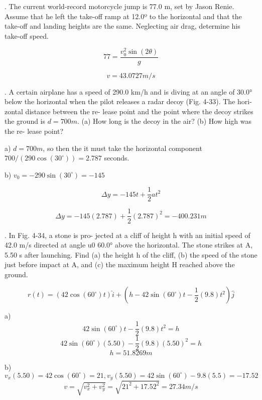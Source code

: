 \documentclass{scrreprt} %
\begin{document}
. The current world-record motorcycle jump is 77.0 m,
set  by  Jason  Renie. Assume  that he  left  the  take-off  ramp  at  
12.0º to the horizontal and that the take-off and landing 
heights are the same. Neglecting air drag, determine his take-off
speed.

$$77=\frac{v_0^2\sin(2\theta)}{g}$$

$$\boxed{v = 43.0727 m/s}$$

. A certain airplane has a
speed  of  290.0 km/h  and  is  diving
at  an  angle  of 30.0° below  the
horizontal  when  the pilot  releases
a radar decoy (Fig. 4-33). The hori-
zontal distance between the re-
lease  point  and  the  point  where
the decoy strikes the ground is $d =
700 m$. (a) How long is the decoy in
the  air?  (b)  How  high  was  the  re-
lease point?

a) $d = 700m$, so then the it must take the horizontal component
$700/(290\cos(30^\circ))=\boxed{2.787}$ seconds.

b) $v_0 = -290\sin(30^\circ) = -145$

$$\Delta y = -145t + \frac{1}{2}at^2$$

$$\Delta y = -145(2.787) + \frac{1}{2}(2.787)^2 = \boxed{-400.231 m}$$

. In Fig. 4-34, a stone is pro-
jected at a cliff of height h with an initial speed of 42.0 m/s directed
at  angle  u0 60.0° above  the  horizontal. The  stone  strikes  at  A,
5.50 s  after  launching. Find  (a)  the  height  h of  the  cliff, (b)  the
speed of the stone just before impact at A, and (c) the maximum
height H reached above the ground.

$$r(t) = (42\cos(60^\circ)t)\hat{i} + (h - 42\sin(60^\circ)t - \frac{1}{2}(9.8)t^2)\hat{j}$$

a)  $$42\sin(60^\circ)t - \frac{1}{2}(9.8)t^2 = h$$
	$$42\sin(60^\circ)(5.50) - \frac{1}{2}(9.8)(5.50)^2 = h$$
	$$\boxed{h = 51.8269 m}$$

b) 	$$v_x(5.50) = 42\cos(60^\circ) = 21, v_y(5.50) = 42\sin(60^\circ) - 9.8(5.5) = -17.52$$
	$$v = \sqrt{v_x^2 + v_y^2} = \sqrt{21^2 + 17.52^2} = \boxed{27.34 m/s}$$
\end{document}
